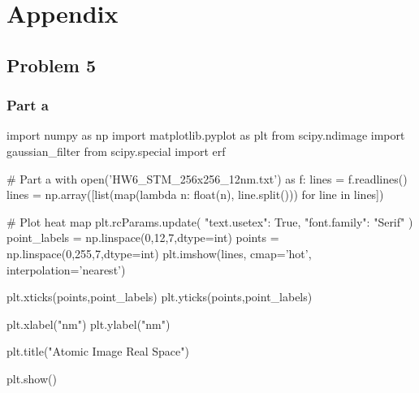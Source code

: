 \pagebreak
\section*{Appendix}
\subsection*{Problem 5}
\subsubsection*{Part a}
\begin{python}
import numpy as np
import matplotlib.pyplot as plt
from scipy.ndimage import gaussian_filter
from scipy.special import erf

# Part a
with open('HW6_STM_256x256_12nm.txt') as f:
    lines = f.readlines()
lines = np.array([list(map(lambda n: float(n), line.split())) for line in lines])

# Plot heat map
plt.rcParams.update({
    "text.usetex": True,
    "font.family": "Serif"
})
point_labels = np.linspace(0,12,7,dtype=int)
points = np.linspace(0,255,7,dtype=int)
plt.imshow(lines, cmap='hot', interpolation='nearest')

plt.xticks(points,point_labels)
plt.yticks(points,point_labels)

plt.xlabel("nm")
plt.ylabel("nm")

plt.title("Atomic Image Real Space")

plt.show()
\end{python}
